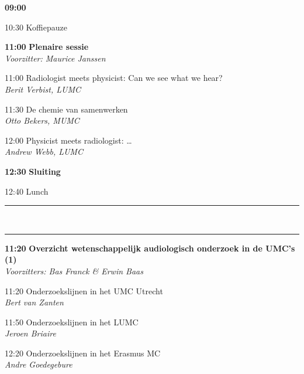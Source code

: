 \documentclass[a4paper,10pt]{report}
\begin{document}
\begin{multicols*}{3}
\columnbreak


\begin{packed_enum}

\item[{\color{Blue} {\textbf{09:00}}}]{}
        \vfill
\item[10:30] Koffiepauze
        \vfill
\item[\textbf{11:00}] {\textbf{Plenaire sessie}}\\\textit{Voorzitter: Maurice Janssen}
\item[11:00] Radiologist meets physicist: Can we see what we hear?\\\textit{Berit Verbist, LUMC}
\item[11:30] De chemie van samenwerken\\\textit{Otto Bekers, MUMC}
\item[12:00] Physicist meets radiologist: \ldots\\\textit{Andrew Webb, LUMC}
        \vfill
\item[\textbf{12:30}] \textbf{Sluiting}
\item[12:40] Lunch

\end{packed_enum}

\hrule \vspace{3mm}
\\
\hrule
\vfill

\begin{packed_enum}
\item[\textbf{11:20}] {\textbf{Overzicht wetenschappelijk audiologisch
    onderzoek in de UMC's (1)}}\\\textit{Voorzitters: Bas Franck \& Erwin Baas}
\item[11:20] Onderzoekslijnen in het UMC Utrecht\\\textit{Bert van Zanten}
\item[11:50] Onderzoekslijnen in het LUMC\\\textit{Jeroen Briaire}
\item[12:20] Onderzoekslijnen in het Erasmus MC\\\textit{Andre Goedegebure}
\end{packed_enum}


\end{multicols*}
\end{document}
